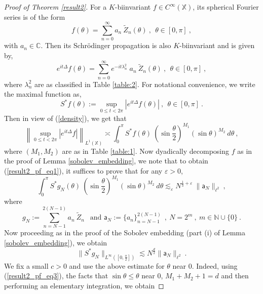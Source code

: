 \documentclass[12pt]{amsart}
\theoremstyle{definition}
\newcommand{\C}{\mathbb C}%
\newcommand{\N}{\mathbb N}%
\newcommand{\X}{\mathbb X}%
\newcommand{\sa}{\textsf{a}}
\numberwithin{equation}{section}
\begin{document}
\begin{proof}[Proof of Theorem \ref{result2}]
For a $K$-biinvariant $f \in C^\infty(\X)$, its spherical Fourier series is of the form
\begin{equation*}
f(\theta)=\sum_{n=0}^\infty a_n \:\tilde{Z}_n(\theta)\:,\:\:\theta \in [0,\pi]\:,
\end{equation*}
with $a_n \in \C$. Then its Schr\"odinger propagation is also $K$-biinvariant and is given by,
\begin{equation*}
e^{it\Delta} f(\theta)=\sum_{n=0}^\infty e^{-it\lambda^2_n}\; a_n \:\tilde{Z}_n(\theta)\:,\:\:\theta \in [0,\pi]\:,
\end{equation*}
where $\lambda^2_n$ are as classified in Table \ref{table:2}. For notational convenience, we write the maximal function as,
\begin{equation*}
S^*f(\theta):= \sup_{0 \le t < 2\pi} \left|e^{it\Delta} f (\theta)\right|\:,\:\:\theta \in [0,\pi]\:.
\end{equation*}
Then in view of (\ref{density}), we get that
\begin{equation*}
\left\|\sup_{0 \le t < 2\pi} \left|e^{it\Delta} f \right|\right\|_{L^1(\X)} \asymp \int_0^\pi S^*f(\theta)\:{\left(\sin \frac{\theta}{2}\right)}^{M_1} {(\sin \theta)}^{M_2}\:d\theta\:,
\end{equation*}
where $(M_1,M_2)$ are as in Table \ref{table:1}. Now dyadically decomposing $f$ as in the proof of Lemma \ref{sobolev_embedding}, we note that to obtain (\ref{result2_pf_eq1}), it suffices to prove that for any $\varepsilon>0$,
\begin{equation} \label{result2_pf_eq2}
\int_0^\pi S^*g_N(\theta)\:{\left(\sin \frac{\theta}{2}\right)}^{M_1} {(\sin \theta)}^{M_2}\:d\theta \lesssim_\varepsilon N^{\frac{1}{3}+\varepsilon}\:\|\sa_N\|_{\ell^2}\:,
\end{equation}
where 
\begin{equation*}
g_N:= \sum_{n=N-1}^{2(N-1)} a_n\:\tilde{Z}_n\:\:\text{   and    } \sa_N := \{a_n\}_{n=N-1}^{2(N-1)}\:\:,\:N=2^m\:,\:m \in \N \cup \{0\}\:.
\end{equation*} 
Now proceeding as in the proof of the Sobolev embedding (part (i) of Lemma \ref{sobolev_embedding}), we obtain
\begin{equation} \label{result2_pf_eq3}
\|S^*g_N\|_{L^\infty\left(\left[0,\frac{\pi}{2}\right]\right)} \lesssim N^{\frac{d}{2}}\|\sa_N\|_{\ell^2}\:.
\end{equation}
We fix a small $c>0$ and use the above estimate for  $\theta$ near $0$. Indeed, using (\ref{result2_pf_eq3}), the facts that  $\sin \theta \le \theta$ near $0$, $M_1+M_2+1=d$ and then performing an elementary integration, we obtain

\end{proof}
\end{document}
